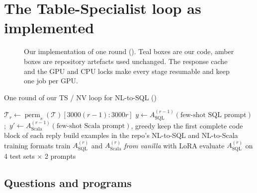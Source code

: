 \section{The Table-Specialist loop as implemented}\label{sec:ours-loop}

\begin{figure}[htbp]
\centering
\begin{adjustbox}{max width=\linewidth}\end{adjustbox}
\caption{Our implementation of one round (). Teal boxes are our code, amber boxes are repository
artefacts used unchanged. The response cache and the GPU and CPU locks make every stage resumable and keep one job per
GPU.}
\label{fig:our-pipeline}
\end{figure}

\begin{algorithm}[htbp]
\caption{One round of our TS / NV loop for NL-to-SQL ()}\label{alg:ours-loop}
$\mathcal{T}_r \leftarrow \operatorname{perm}_s(\mathcal{T})[3000(r-1):3000r]$\;
$y \leftarrow A^{(r-1)}_{\text{SQL}}(\text{few-shot SQL prompt})$;\ $y' \leftarrow A^{(r-1)}_{\text{Scala}}(\text{few-shot
Scala prompt})$, greedy\;
keep the first complete code block of each reply
build examples in the repo's NL-to-SQL and NL-to-Scala training formats\;
train $A^{(r)}_{\text{SQL}}$ and $A^{(r)}_{\text{Scala}}$ \emph{from vanilla} with LoRA
evaluate $A^{(r)}_{\text{SQL}}$ on 4 test sets $\times$ 2 prompts\;
\end{algorithm}

\subsection{Questions and programs}

